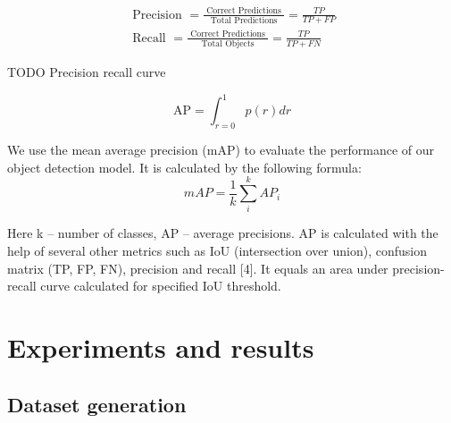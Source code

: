 \documentclass[14pt,a4paper]{extarticle}
\newcounter{e}
\numberwithin{equation}{section}
\numberwithin{figure}{section}
\begin{document}
\begin{equation}
    \begin{gathered}
        \text { Precision }=\frac{\text { Correct Predictions }}{\text { Total Predictions }}=\frac{T P}{T P+F P} \\
        \text { Recall }=\frac{\text { Correct Predictions }}{\text { Total Objects }}=\frac{T P}{T P+F N}
    \end{gathered}
\end{equation}

TODO Precision recall curve

\begin{equation}
    \mathrm{AP}=\int_{r=0}^1 p(r) d r
\end{equation}


We use the mean average precision (mAP) to evaluate the performance of our object detection model. It is calculated by the following formula:
\begin{equation}
    m A P=\frac{1}{k} \sum_i^k A P_i 
\end{equation}

Here k – number of classes, AP – average precisions. AP is calculated with the help of several other metrics such as IoU (intersection over union), confusion matrix (TP, FP, FN), precision and recall [4]. It equals an area under precision-recall curve calculated for specified IoU threshold.



\newpage
\thispagestyle{empty}

\newpage
\thispagestyle{empty}
\section{Experiments and results}
\subsection{Dataset generation}

\end{document}
